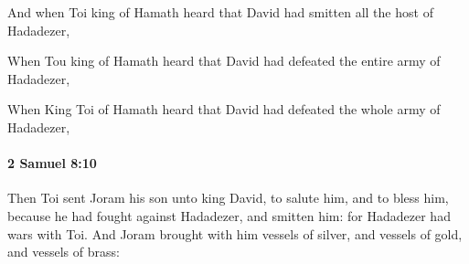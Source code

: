 			\begin{versebox}
					\item[BHS] 
					\item[ASV] And when Toi king of Hamath heard that David had smitten all the host of Hadadezer,
					\item[NIV] When Tou king of Hamath heard that David had defeated the entire army of Hadadezer,
					\item[NRSV] When King Toi of Hamath heard that David had defeated the whole army of Hadadezer,
			\end{versebox}

		\paragraph{2 Samuel 8:10} %
			\label{2SAMUEL-8-10}

			Then Toi sent Joram his son unto king David, to salute him, and to bless him, because he had fought against Hadadezer, and smitten him: for Hadadezer had wars with Toi. And Joram brought with him vessels of silver, and vessels of gold, and vessels of brass:

